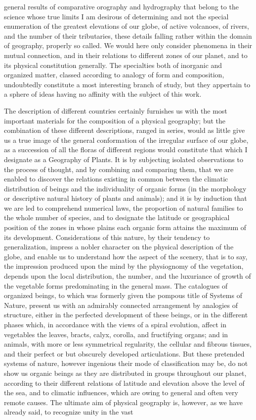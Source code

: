 general results of comparative orography and hydrography that belong to the science whose true limits I am desirous of determining and not the special enumeration of the greatest elevations of our globe, of active volcanoes, of rivers, and the number of their tributaries, these details falling rather within the domain of geography, properly so called. We would here only consider phenomena in their mutual connection, and in their relations to different zones of our planet, and to its physical constitution generally. The specialties both of inorganic and organized matter, classed according to analogy of form and composition, undoubtedly constitute a most interesting branch of study, but they appertain to a sphere of ideas having no affinity with the subject of this work.

The description of different countries certainly furnishes us with the most important materials for the composition of a physical geography; but the combination of these different descriptions, ranged in series, would as little give us a true image of the general conformation of the irregular surface of our globe, as a succession of all the floras of different regions would constitute that which I designate as a Geography of Plants. It is by subjecting isolated observations to the process of thought, and by combining and comparing them, that we are enabled to discover the relations existing in common between the climatic distribution of beings and the individuality of organic forms (in the morphology or descriptive natural history of plants and animals); and it is by induction that we are led to comprehend numerical laws, the proportion of natural families to the whole number of species, and to designate the latitude or geographical position of the zones in whose plains each organic form attains the maximum of its development. Considerations of this nature, by their tendency to generalization, impress a nobler character on the physical description of the globe, and enable us to understand how the aspect of the scenery, that is to say, the impression produced upon the mind by the physiognomy of the vegetation, depends upon the local distribution, the number, and the luxuriance of growth of the vegetable forms predominating in the general mass. The catalogues of organized beings, to which was formerly given the pompous title of Systems of Nature, present us with an admirably connected arrangement by analogies of structure, either in the perfected development of these beings, or in the different phases which, in accordance with the views of a spiral evolution, affect in vegetables the leaves, bracts, calyx, corolla, and fructifying organs; and in animals, with more or less symmetrical regularity, the cellular and fibrous tissues, and their perfect or but obscurely developed articulations. But these pretended systems of nature, however ingenious their mode of classification may be, do not show us organic beings as they are distributed in groups throughout our planet, according to their different relations of latitude and elevation above the level of the sea, and to climatic influences, which are owing to general and often very remote causes. The ultimate aim of physical geography is, however, as we have already said, to recognize unity in the vast 